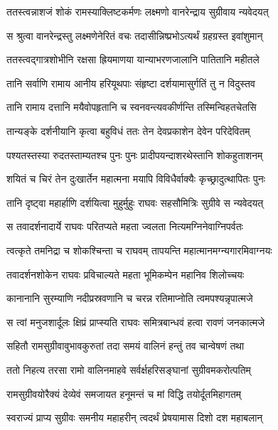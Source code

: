 \twolineshloka
{ततस्त्वन्नाशजं शोकं रामस्याक्लिष्टकर्मणः}
{लक्ष्मणो वानरेन्द्राय सुग्रीवाय न्यवेदयत्} %

\twolineshloka
{स श्रुत्वा वानरेन्द्रस्तु लक्ष्मणेनेरितं वचः}
{तदासीन्निष्प्रभोऽत्यर्थं ग्रहग्रस्त इवांशुमान्} %

\twolineshloka
{ततस्त्वद्गात्रशोभीनि रक्षसा ह्रियमाणया}
{यान्याभरणजालानि पातितानि महीतले} %

\twolineshloka
{तानि सर्वाणि रामाय आनीय हरियूथपाः}
{संहृष्टा दर्शयामासुर्गतिं तु न विदुस्तव} %

\twolineshloka
{तानि रामाय दत्तानि मयैवोपहृतानि च}
{स्वनवन्त्यवकीर्णन्ति तस्मिन्विहतचेतसि} %

\twolineshloka
{तान्यङ्के दर्शनीयानि कृत्वा बहुविधं ततः}
{तेन देवप्रकाशेन देवेन परिदेवितम्} %

\twolineshloka
{पश्यतस्तस्या रुदतस्ताम्यतश्च पुनः पुनः}
{प्रादीपयन्दाशरथेस्तानि शोकहुताशनम्} %

\twolineshloka
{शयितं च चिरं तेन दुःखार्तेन महात्मना}
{मयापि विविधैर्वाक्यैः कृच्छ्रादुत्थापितः पुनः} %

\twolineshloka
{तानि दृष्ट्वा महार्हाणि दर्शयित्वा मुहुर्मुहुः}
{राघवः सहसौमित्रिः सुग्रीवे स न्यवेदयत्} %

\twolineshloka
{स तवादर्शनादार्ये राघवः परितप्यते}
{महता ज्वलता नित्यमग्निनेवाग्निपर्वतः} %

\twolineshloka
{त्वत्कृते तमनिद्रा च शोकश्चिन्ता च राघवम्}
{तापयन्ति महात्मानमग्न्यगारमिवाग्नयः} %

\twolineshloka
{तवादर्शनशोकेन राघवः प्रविचाल्यते}
{महता भूमिकम्पेन महानिव शिलोच्चयः} %

\twolineshloka
{कानानानि सुरम्याणि नदीप्रस्रवणानि च}
{चरन्न रतिमाप्नोति त्वमपश्यन्नृपात्मजे} %

\twolineshloka
{स त्वां मनुजशार्दूलः क्षिप्रं प्राप्स्यति राघवः}
{समित्रबान्धवं हत्वा रावणं जनकात्मजे} %

\twolineshloka
{सहितौ रामसुग्रीवावुभावकुरुतां तदा}
{समयं वालिनं हन्तुं तव चान्वेषणं तथा} %

\twolineshloka
{ततो निहत्य तरसा रामो वालिनमाहवे}
{सर्वर्क्षहरिसङ्घानां सुग्रीवमकरोत्पतिम्} %

\twolineshloka
{रामसुग्रीवयोरैक्यं देव्येवं समजायत}
{हनूमन्तं च मां विद्धि तयोर्दूतमिहागतम्} %

\twolineshloka
{स्वराज्यं प्राप्य सुग्रीवः समनीय महाहरीन्}
{त्वदर्थं प्रेषयामास दिशो दश महाबलान्} %

